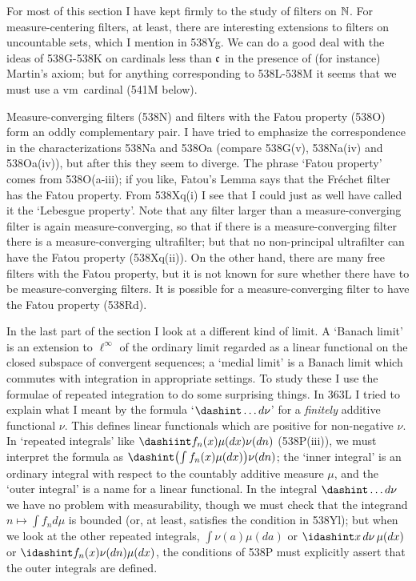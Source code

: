 {For most of this section I have kept firmly to the study of filters on
$\Bbb N$.   For measure-centering filters, at least, there are interesting
extensions to filters on uncountable sets, which I mention in 538Yg.   We
can do a good deal with the ideas of 538G-538K on cardinals less than
$\frak c$ in the presence of (for instance) Martin's axiom;  but for
anything corresponding to 538L-538M it seems that we must use a \2vm\
cardinal (541M below).

Measure-converging filters (538N) and filters with the Fatou property
(538O) form an oddly complementary pair.   I have tried to emphasize the
correspondence in the
characterizations 538Na and 538Oa
(compare 538G(v), 538Na(iv) and 538Oa(iv)),
but after this they seem to diverge.   The phrase `Fatou
property' comes from 538O(a-iii);  if you like, Fatou's Lemma says that the
Fr\'echet filter has the Fatou property.   From 538Xq(i) I see that I could
just as well have called it the `Lebesgue property'.
Note that any filter
larger than a measure-converging filter is again measure-converging, so
that if there is a measure-converging filter there is a measure-converging
ultrafilter;  but that no non-principal ultrafilter can have the Fatou
property (538Xq(ii)).   On the other hand, there are many free filters with the
Fatou property, but it is not known for sure whether there have to be
measure-converging filters.   It is possible for a
measure-converging filter to have the Fatou property (538Rd).

In the last part of the section I look at a different kind of limit.   A
`Banach limit' is an extension to $\ell^{\infty}$
of the ordinary limit regarded as a linear functional on the closed
subspace of convergent sequences;  a `medial limit' is a Banach limit which
commutes with integration in appropriate settings.   To study these
I use the formulae of repeated integration to do some
surprising things.   In 363L I tried to explain what I meant by the formula
`$\dashint\ldots d\nu$' for a {\it finitely} additive functional $\nu$.
This defines linear functionals which are positive for non-negative $\nu$.
In `repeated integrals' like $\dashiint f_n(x)\mu(dx)\nu(dn)$ (538P(iii)),
we must interpret the formula
as $\dashint\bigl(\int f_n(x)\mu(dx)\bigr)\nu(dn)$;  the `inner
integral' is an ordinary integral with respect to the countably additive
measure $\mu$, and the `outer integral' is a name for a linear functional.
In the integral $\dashint\ldots d\nu$
we have no problem with measurability,
though we must check that the integrand $n\mapsto\int f_nd\mu$ is bounded
(or, at least, satisfies the condition in 538Yl);
but when we look at the other repeated integrals, $\int\nu(a)\mu(da)$ or
$\idashint x\,d\nu\,\mu(dx)$ or $\idashint f_n(x)\nu(dn)\mu(dx)$,
the conditions of 538P must explicitly assert
that the outer integrals are defined.

}
